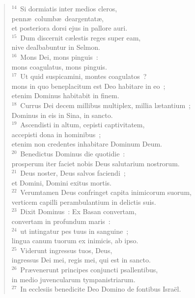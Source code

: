 \begin{flushleft}
\begin{verse}
${}^{14}$~Si dormiatis inter medios cleros,\\ penn\ae\ columb\ae\ deargentat\ae ,\\ et posteriora dorsi ejus in pallore auri.\\
${}^{15}$~Dum discernit c\ae lestis reges super eam,\\ nive dealbabuntur in Selmon.\\
${}^{16}$~Mons Dei, mons pinguis~:\\ mons coagulatus, mons pinguis.\\
${}^{17}$~Ut quid suspicamini, montes coagulatos~?\\ mons in quo beneplacitum est Deo habitare in eo~;\\ etenim Dominus habitabit in finem.\\
${}^{18}$~Currus Dei decem millibus multiplex, millia l\ae tantium~;\\ Dominus in eis in Sina, in sancto.\\
${}^{19}$~Ascendisti in altum, cepisti captivitatem,\\ accepisti dona in hominibus~;\\ etenim non credentes inhabitare Dominum Deum.\\
${}^{20}$~Benedictus Dominus die quotidie~:\\ prosperum iter faciet nobis Deus salutarium nostrorum.\\
${}^{21}$~Deus noster, Deus salvos faciendi~;\\ et Domini, Domini exitus mortis.\\
${}^{22}$~Verumtamen Deus confringet capita inimicorum suorum,\\ verticem capilli perambulantium in delictis suis.\\
${}^{23}$~Dixit Dominus~: Ex Basan convertam,\\ convertam in profundum maris~:\\
${}^{24}$~ut intingatur pes tuus in sanguine~;\\ lingua canum tuorum ex inimicis, ab ipso.\\
${}^{25}$~Viderunt ingressus tuos, Deus,\\ ingressus Dei mei, regis mei, qui est in sancto.\\
${}^{26}$~Pr\ae venerunt principes conjuncti psallentibus,\\ in medio juvencularum tympanistriarum.\\
${}^{27}$~In ecclesiis benedicite Deo Domino de fontibus Isra\"el.\\

\end{verse}
\end{flushleft}
